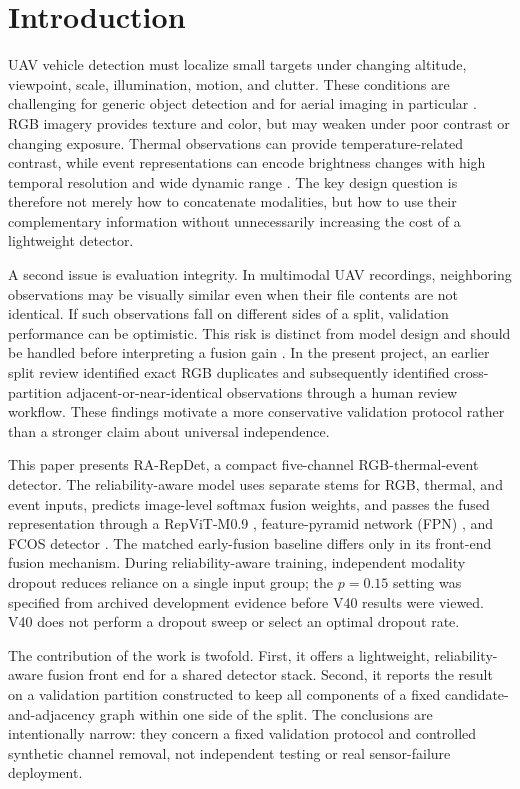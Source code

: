 \section{Introduction}
UAV vehicle detection must localize small targets under changing altitude, viewpoint, scale, illumination, motion, and clutter. These conditions are challenging for generic object detection and for aerial imaging in particular \cite{zhao2019object,cheng2016survey,xia2022dota,zhu2017deepRS}. RGB imagery provides texture and color, but may weaken under poor contrast or changing exposure. Thermal observations can provide temperature-related contrast, while event representations can encode brightness changes with high temporal resolution and wide dynamic range \cite{baltrusaitis2019multimodal,gallego2022event}. The key design question is therefore not merely how to concatenate modalities, but how to use their complementary information without unnecessarily increasing the cost of a lightweight detector.

A second issue is evaluation integrity. In multimodal UAV recordings, neighboring observations may be visually similar even when their file contents are not identical. If such observations fall on different sides of a split, validation performance can be optimistic. This risk is distinct from model design and should be handled before interpreting a fusion gain \cite{kapoor2023leakage,cawley2010overfitting}. In the present project, an earlier split review identified exact RGB duplicates and subsequently identified cross-partition adjacent-or-near-identical observations through a human review workflow. These findings motivate a more conservative validation protocol rather than a stronger claim about universal independence.

This paper presents RA-RepDet, a compact five-channel RGB-thermal-event detector. The reliability-aware model uses separate stems for RGB, thermal, and event inputs, predicts image-level softmax fusion weights, and passes the fused representation through a RepViT-M0.9 \cite{wang2024repvit}, feature-pyramid network (FPN) \cite{lin2017fpn}, and FCOS detector \cite{tian2019fcos}. The matched early-fusion baseline differs only in its front-end fusion mechanism. During reliability-aware training, independent modality dropout reduces reliance on a single input group; the $p=0.15$ setting was specified from archived development evidence before V40 results were viewed. V40 does not perform a dropout sweep or select an optimal dropout rate.

The contribution of the work is twofold. First, it offers a lightweight, reliability-aware fusion front end for a shared detector stack. Second, it reports the result on a validation partition constructed to keep all components of a fixed candidate-and-adjacency graph within one side of the split. The conclusions are intentionally narrow: they concern a fixed validation protocol and controlled synthetic channel removal, not independent testing or real sensor-failure deployment.

